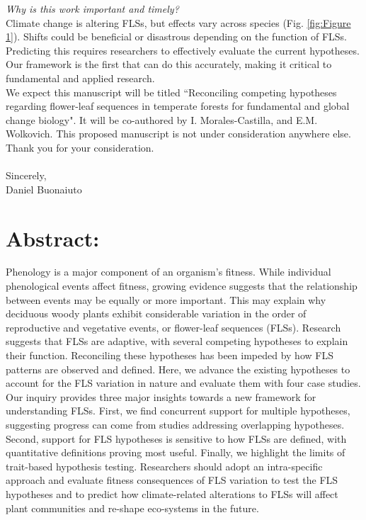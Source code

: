 \documentclass[11pt,a4paper]{article}
\begin{document}
\noindent \emph{Why is this work important and timely?}\\

\noindent Climate change is altering FLSs, but effects vary across species (Fig. \ref{fig:Figure 1}). Shifts could be beneficial or disastrous depending on the function of FLSs. Predicting this requires researchers to effectively evaluate the current hypotheses. Our framework is the first that can do this accurately, making it critical to fundamental and applied research.\\

 \noindent We expect this manuscript will be titled ``Reconciling competing hypotheses regarding flower-leaf sequences in temperate forests for fundamental and global change biology". It will be co-authored by I. Morales-Castilla, and E.M. Wolkovich. This proposed manuscript is not under consideration anywhere else. Thank you for your consideration.\\
\\Sincerely,\\

Daniel Buonaiuto
\newpage
\section*{Abstract:}
Phenology is a major component of an organism's fitness. While individual phenological events affect fitness, growing evidence suggests that the relationship between events may be equally or more important. This may explain why deciduous woody plants exhibit considerable variation in the order of reproductive and vegetative events, or flower-leaf sequences (FLSs). Research suggests that FLSs are adaptive, with several competing hypotheses to explain their function. Reconciling these hypotheses has been impeded by how FLS patterns are observed and defined. Here, we advance the existing hypotheses to account for the FLS variation in nature and evaluate them with four case studies. Our inquiry provides three major insights towards a new framework for understanding FLSs. First, we find concurrent support for multiple hypotheses, suggesting progress can come from studies addressing overlapping hypotheses. Second, support for FLS hypotheses is sensitive to how FLSs are defined, with quantitative definitions proving most useful. Finally, we highlight the limits of trait-based hypothesis testing. Researchers should adopt an intra-specific approach and evaluate fitness consequences of FLS variation to test the FLS hypotheses and to predict how climate-related alterations to FLSs will affect plant communities and re-shape eco-systems in the future. %
\end{document}
